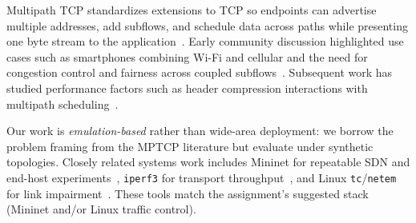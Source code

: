 \label{sec:related_work}

Multipath TCP standardizes extensions to TCP so endpoints can advertise multiple addresses, add subflows, and schedule data across paths while presenting one byte stream to the application~\cite{rfc8684}. Early community discussion highlighted use cases such as smartphones combining Wi-Fi and cellular and the need for congestion control and fairness across coupled subflows~\cite{Bonaventure2012usecases}. Subsequent work has studied performance factors such as header compression interactions with multipath scheduling~\cite{Paasch2014experimental}.

Our work is \emph{emulation-based} rather than wide-area deployment: we borrow the problem framing from the MPTCP literature but evaluate under synthetic topologies. Closely related systems work includes Mininet for repeatable SDN and end-host experiments~\cite{Lantz2010mininet}, \texttt{iperf3} for transport throughput~\cite{iperf3}, and Linux \texttt{tc}/\texttt{netem} for link impairment~\cite{linuxnetem}. These tools match the assignment's suggested stack (Mininet and/or Linux traffic control).
